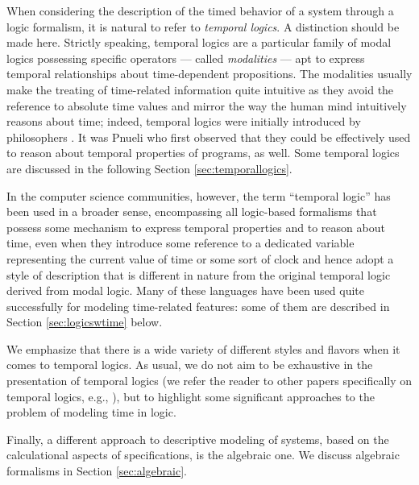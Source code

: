 When considering the description of the timed behavior of a system 
through a logic formalism, it is natural to refer to \emph{temporal 
logics}. A distinction should be made here. Strictly speaking, 
temporal logics are a particular family of modal logics \cite{Kri63,RU71} 
possessing specific operators --- called \emph{modalities} --- apt 
to express temporal relationships about time-dependent propositions. 
The modalities usually make the treating of time-related information 
quite intuitive as they avoid the  reference to absolute 
time values and mirror the way the human mind intuitively reasons 
about time; indeed, temporal logics were initially introduced 
by philosophers \cite{Kam68}. It was Pnueli who first observed \cite{Pnu77} 
that they could be effectively used to reason about temporal 
properties of programs, as well. Some temporal logics are discussed 
in the following Section \ref{sec:temporallogics}.

In the computer science communities, however, the term ``temporal 
logic'' has been used in a broader sense, encompassing all logic-based 
formalisms that possess some mechanism to express temporal properties 
and to reason about time, even when they introduce some  
reference to a dedicated variable representing the current value 
of time or some sort of clock and hence adopt a style of description 
that is different in nature from the original temporal logic 
derived from modal logic. Many of these languages have been used 
quite successfully for modeling time-related features: some of 
them are described in Section \ref{sec:logicswtime} below.

We emphasize that there is a wide variety of different styles 
and flavors when it comes to temporal logics. As usual, we do 
not aim to be exhaustive in the presentation of temporal logics 
(we refer the reader to other papers specifically on temporal 
logics, e.g., \cite{Eme90,AH93,AH92,Ost92,Hen98,BMN00,FPR}), but 
to highlight some significant approaches to the problem of modeling 
time in logic.

Finally, a different approach to descriptive modeling of systems, 
based on the calculational aspects of specifications, is the 
algebraic one. We discuss algebraic formalisms in Section \ref{sec:algebraic}.


